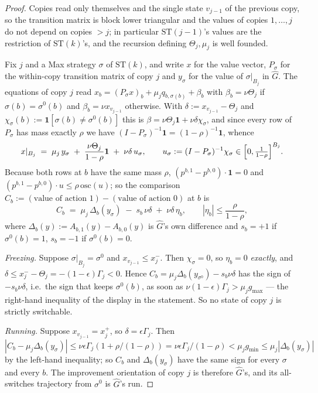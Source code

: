 \begin{proof}
Copies read only themselves and the single state $v_{j-1}$ of the previous copy, so
the transition matrix is block lower triangular and the values of copies
$1,\dots,j$ do not depend on copies $>j$; in particular $\mathrm{ST}(j-1)$'s values are
the restriction of $\mathrm{ST}(k)$'s, and the recursion defining $\Theta_j,\mu_j$ is
well founded.

Fix $j$ and a Max strategy $\sigma$ of $\mathrm{ST}(k)$, and write $x$ for the value
vector, $P_\sigma$ for the within-copy transition matrix of copy $j$ and
$y_\sigma$ for the value of $\sigma|_{B_j}$ in $\widehat G$. The equations of copy $j$
read $x_b=(P_\sigma x)_b+\mu_jq_{b,\sigma(b)}+\beta_b$ with
$\beta_b=\nu\Theta_j$ if $\sigma(b)=\sigma^{0}(b)$ and $\beta_b=\nu x_{v_{j-1}}$
otherwise. With $\delta:=x_{v_{j-1}}-\Theta_j$ and
$\chi_\sigma(b):=\mathbf 1[\sigma(b)\ne\sigma^{0}(b)]$ this is
$\beta=\nu\Theta_j\mathbf 1+\nu\delta\chi_\sigma$, and since every row of $P_\sigma$
has mass exactly $\rho$ we have $(I-P_\sigma)^{-1}\mathbf 1=(1-\rho)^{-1}\mathbf 1$,
whence
\[
  x|_{B_j}\;=\;\mu_j\,y_\sigma\;+\;\frac{\nu\Theta_j}{1-\rho}\mathbf 1
  \;+\;\nu\delta\,u_\sigma,\qquad u_\sigma:=(I-P_\sigma)^{-1}\chi_\sigma\in\Bigl[0,\tfrac1{1-\rho}\Bigr]^{B_j}.
\]
Because both rows at $b$ have the same mass $\rho$, $(p^{b,1}-p^{b,0})\cdot\mathbf 1=0$
and $(p^{b,1}-p^{b,0})\cdot u\le\rho\,\mathrm{osc}(u)$; so the comparison
$C_b:=(\text{value of action }1)-(\text{value of action }0)$ at $b$ is
\[
  C_b\;=\;\mu_j\,\Delta_b(y_\sigma)\;-\;s_b\,\nu\delta\;+\;\nu\delta\,\eta_b,
  \qquad |\eta_b|\le\frac{\rho}{1-\rho},
\]
where $\Delta_b(y):=A_{b,1}(y)-A_{b,0}(y)$ is $\widehat G$'s own difference and
$s_b=+1$ if $\sigma^{0}(b)=1$, $s_b=-1$ if $\sigma^{0}(b)=0$.

\emph{Freezing.} Suppose $\sigma|_{B_j}=\sigma^{0}$ and $x_{v_{j-1}}\le x^{-}_j$. Then
$\chi_\sigma=0$, so $\eta_b=0$ \emph{exactly}, and
$\delta\le x^{-}_j-\Theta_j=-(1-\epsilon)\Gamma_j<0$. Hence
$C_b=\mu_j\Delta_b(y_{\sigma^{0}})-s_b\nu\delta$ has the sign of $-s_b\nu\delta$,
i.e.\ the sign that keeps $\sigma^{0}(b)$, as soon as
$\nu(1-\epsilon)\Gamma_j>\mu_jg_{\max}$ --- the right-hand inequality of the display in
the statement. So no state of copy $j$ is strictly switchable.

\emph{Running.} Suppose $x_{v_{j-1}}=x^{+}_j$, so $\delta=\epsilon\Gamma_j$. Then
$|C_b-\mu_j\Delta_b(y_\sigma)|\le\nu\epsilon\Gamma_j(1+\rho/(1-\rho))
=\nu\epsilon\Gamma_j/(1-\rho)<\mu_jg_{\min}\le\mu_j|\Delta_b(y_\sigma)|$ by the
left-hand inequality; so $C_b$ and $\Delta_b(y_\sigma)$ have the same sign for every
$\sigma$ and every $b$. The improvement orientation of copy $j$ is therefore
$\widehat G$'s, and its all-switches trajectory from $\sigma^{0}$ is $\widehat G$'s run.


\end{proof}
